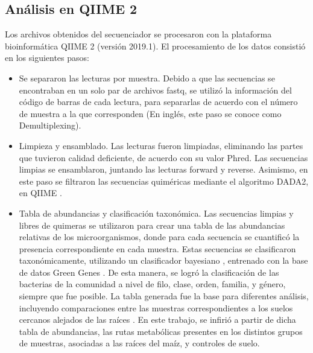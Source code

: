 \documentclass[12pt,letterpaper,oneside]{report}
\begin{document}
\subsection{Análisis en QIIME 2}
Los archivos obtenidos del secuenciador se procesaron con la plataforma bioinformática QIIME 2 (versión 2019.1). El procesamiento de los datos consistió en los siguientes pasos:
\begin{itemize}
\item Se separaron las lecturas por muestra. Debido a que las secuencias se encontraban en un solo par de archivos fastq, se utilizó la información del código de barras de cada lectura, para separarlas de acuerdo con el número de muestra a la que corresponden (En inglés, este paso se conoce como Demultiplexing).
\item Limpieza y ensamblado. Las lecturas fueron limpiadas, eliminando las partes que tuvieron calidad deficiente, de acuerdo con su valor Phred. Las secuencias limpias se ensamblaron, juntando las lecturas forward y reverse. Asimismo, en este paso se filtraron las secuencias quiméricas mediante el algoritmo DADA2, en QIIME \autocite{Callahan2016}.
\item Tabla de abundancias y clasificación taxonómica. Las secuencias limpias y libres de quimeras se utilizaron para crear una tabla de las abundancias relativas de los microorganismos, donde para cada secuencia se cuantificó la presencia correspondiente en cada muestra. Estas secuencias se clasificaron taxonómicamente, utilizando un clasificador bayesiano \autocite{Werner2011}, entrenado con la base de datos Green Genes \autocite{DeSantis2006}. De esta manera, se logró la clasificación de las bacterias de la comunidad a nivel de filo, clase, orden, familia, y género, siempre que fue posible. La tabla generada fue la base para diferentes análisis, incluyendo comparaciones entre las muestras correspondientes a los suelos cercanos alejados de las raíces \autocite{Aguirre-von-Wobeser2018}. En este trabajo, se infirió a partir de dicha tabla de abundancias, las rutas metabólicas presentes en los distintos grupos de muestras, asociadas a las raíces del maíz, y controles de suelo.
\end{itemize}
\end{document}
